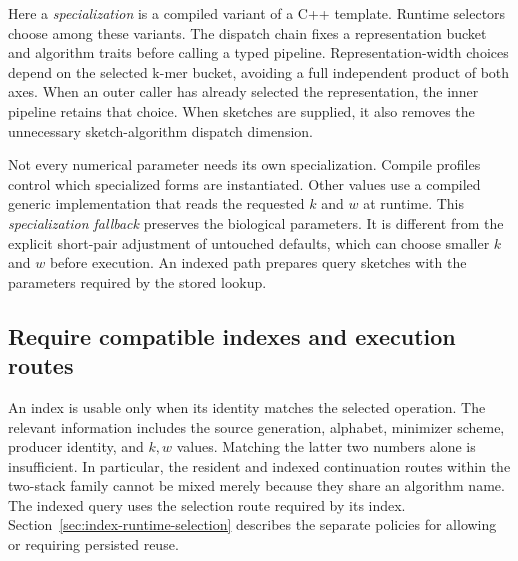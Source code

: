 Here a \emph{specialization} is a compiled variant of a C++ template.
Runtime selectors choose among these variants. The dispatch chain fixes
a representation bucket and algorithm traits before
calling a typed pipeline. Representation-width choices depend on the
selected k-mer bucket, avoiding a full independent product of both axes.
When an outer caller has already selected the representation, the inner
pipeline retains that choice. When sketches are supplied, it also removes
the unnecessary sketch-algorithm dispatch dimension.

Not every numerical parameter needs its own specialization. Compile profiles
control which specialized forms are instantiated. Other values use a compiled
generic implementation that reads the requested $k$ and $w$ at runtime. This
\emph{specialization fallback} preserves the biological parameters. It is
different from the explicit short-pair adjustment of untouched defaults,
which can choose smaller $k$ and $w$ before execution. An indexed path
prepares query sketches with the parameters required by the stored lookup.

\subsection{Require compatible indexes and execution routes}
\label{sec:arch-route-admission}

An index is usable only when its identity matches the selected operation.
The relevant information includes the source generation, alphabet,
minimizer scheme, producer identity, and $k,w$ values. Matching the latter
two numbers alone is insufficient. In particular, the resident and indexed
continuation routes within the two-stack family cannot be mixed merely
because they share an algorithm name. The indexed query uses the selection
route required by its index. Section~\ref{sec:index-runtime-selection}
describes the separate policies for allowing or requiring persisted reuse.

